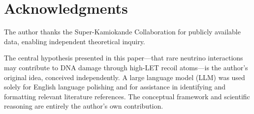 \documentclass[12pt,a4paper]{article}
\begin{document}
\section*{Acknowledgments}

The author thanks the Super-Kamiokande Collaboration for publicly available data, enabling independent theoretical inquiry.

The central hypothesis presented in this paper---that rare neutrino interactions may contribute to DNA damage through high-LET recoil atoms---is the author's original idea, conceived independently. A large language model (LLM) was used solely for English language polishing and for assistance in identifying and formatting relevant literature references. The conceptual framework and scientific reasoning are entirely the author's own contribution.
\end{document}

